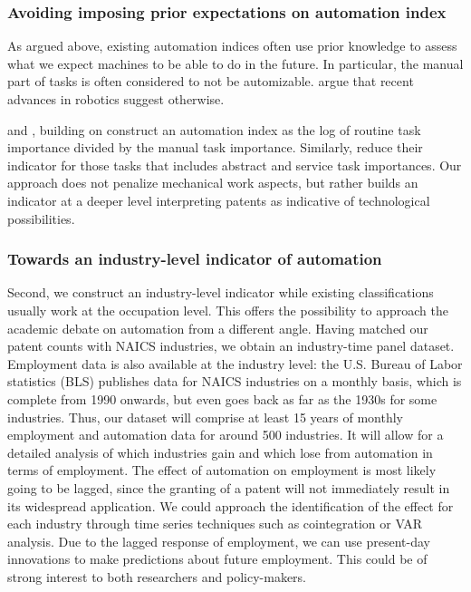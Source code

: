 \documentclass[11pt,a4paper]{article}
\begin{document}
\subsubsection*{Avoiding imposing prior expectations on automation index}
As argued above, existing automation indices often use prior knowledge to assess what we expect machines to be able to do in the future. In particular, the manual part of tasks is often considered to not be automizable. \cite{BM2014} argue that recent advances in robotics suggest otherwise. 

\cite{AKK2008} and \cite{AD2013}, building on \cite{ALM2003} construct an automation index as the log of routine task importance divided by the manual task importance. Similarly, \cite{GMS2014} reduce their indicator for those tasks that includes abstract and service task importances. Our approach does not penalize mechanical work aspects, but rather builds an indicator at a deeper level interpreting patents as indicative of technological possibilities.


\subsubsection*{Towards an industry-level indicator of automation}
Second, we construct an industry-level indicator while existing classifications usually work at the occupation level. This offers the possibility to approach the academic debate on automation from a different angle. Having matched our patent counts with NAICS industries, we obtain an industry-time panel dataset. Employment data is also available at the industry level: the U.S. Bureau of Labor statistics (BLS) publishes data for NAICS industries on a monthly basis, which is complete from 1990 onwards, but even goes back as far as the 1930s for some industries. Thus, our dataset will comprise at least 15 years of monthly employment and automation data for around 500 industries. It will allow for a detailed analysis of which industries gain and which lose from automation in terms of employment. The effect of automation on employment is most likely going to be lagged, since the granting of a patent will not immediately result in its widespread application. We could approach the identification of the effect for each industry through time series techniques such as cointegration or VAR analysis. Due to the lagged response of employment, we can use present-day innovations to make predictions about future employment. This could be of strong interest to both researchers and policy-makers.
\end{document}
